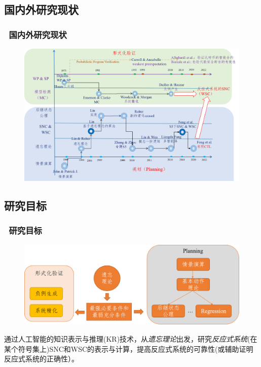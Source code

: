 \documentclass[9pt, CJK]{beamer}
\begin{document}
	\subsection{国内外研究现状} 
	\begin{frame}
		\frametitle{~国内外研究现状}
		\begin{figure}
			\includegraphics[scale=0.35]{figures/history2}
		\end{figure}
	\end{frame}

\subsection{研究目标}
	\begin{frame}
		\frametitle{~研究目标}
		\begin{figure}
			\includegraphics[scale=0.3]{figures/mubiao}
		\end{figure}
{\footnotesize	通过人工智能的知识表示与推理(KR)技术，从{\em 遗忘理论}出发，研究{\em 反应式系统}(在某个符号集上)SNC和WSC的表示与计算，提高反应式系统的可靠性(或辅助证明反应式系统的正确性）。
}
	\end{frame}
\end{document}
